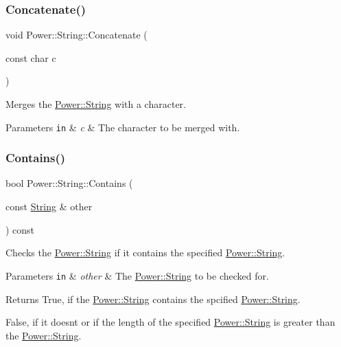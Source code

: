 \subsubsection{\texorpdfstring{Concatenate()}{Concatenate()}\hspace{0.1cm}{\footnotesize\ttfamily [4/4]}}
{\footnotesize\ttfamily void Power\+::\+String\+::\+Concatenate (\begin{DoxyParamCaption}\item[{const char}]{c }\end{DoxyParamCaption})\hspace{0.3cm}{\ttfamily [inline]}}



Merges the \hyperlink{class_power_1_1_string}{Power\+::\+String} with a character. 


\begin{DoxyParams}[1]{Parameters}
\mbox{\tt in}  & {\em c} & The character to be merged with. \\
\hline
\end{DoxyParams}
\mbox{\label{class_power_1_1_string_aeaa32e499b49e67539953355b53609a8}} 
\subsubsection{\texorpdfstring{Contains()}{Contains()}\hspace{0.1cm}{\footnotesize\ttfamily [1/4]}}
{\footnotesize\ttfamily bool Power\+::\+String\+::\+Contains (\begin{DoxyParamCaption}\item[{const \hyperlink{class_power_1_1_string}{String} \&}]{other }\end{DoxyParamCaption}) const\hspace{0.3cm}{\ttfamily [inline]}}



Checks the \hyperlink{class_power_1_1_string}{Power\+::\+String} if it contains the specified \hyperlink{class_power_1_1_string}{Power\+::\+String}. 


\begin{DoxyParams}[1]{Parameters}
\mbox{\tt in}  & {\em other} & The \hyperlink{class_power_1_1_string}{Power\+::\+String} to be checked for. \\
\hline
\end{DoxyParams}
\begin{DoxyReturn}{Returns}
True, if the \hyperlink{class_power_1_1_string}{Power\+::\+String} contains the spcified \hyperlink{class_power_1_1_string}{Power\+::\+String}. 

False, if it doesn\textquotesingle{}t or if the length of the specified \hyperlink{class_power_1_1_string}{Power\+::\+String} is greater than the \hyperlink{class_power_1_1_string}{Power\+::\+String}. 
\end{DoxyReturn}
\mbox{\label{class_power_1_1_string_ad90a05c6e07bcd98684bd7c2aec7723f}} 
